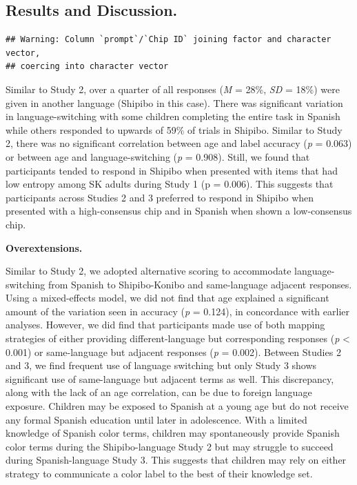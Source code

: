 \documentclass[man]{apa6}
\theoremstyle{definition}
\theoremstyle{definition}
\theoremstyle{definition}
\theoremstyle{remark}
\begin{document}
\subsection{Results and Discussion.}\label{results-and-discussion.}

\begin{verbatim}
## Warning: Column `prompt`/`Chip ID` joining factor and character vector,
## coercing into character vector
\end{verbatim}

Similar to Study 2, over a quarter of all responses (\emph{M} = 28\%,
\emph{SD} = 18\%) were given in another language (Shipibo in this case).
There was significant variation in language-switching with some children
completing the entire task in Spanish while others responded to upwards
of 59\% of trials in Shipibo. Similar to Study 2, there was no
significant correlation between age and label accuracy (\emph{p} =
0.063) or between age and language-switching (\emph{p} = 0.908). Still,
we found that participants tended to respond in Shipibo when presented
with items that had low entropy among SK adults during Study 1 (p =
0.006). This suggests that participants across Studies 2 and 3 preferred
to respond in Shipibo when presented with a high-consensus chip and in
Spanish when shown a low-consensus chip.

\textbf{Overextensions.}

Similar to Study 2, we adopted alternative scoring to accommodate
language-switching from Spanish to Shipibo-Konibo and same-language
adjacent responses. Using a mixed-effects model, we did not find that
age explained a significant amount of the variation seen in accuracy
(\emph{p} = 0.124), in concordance with earlier analyses. However, we
did find that participants made use of both mapping strategies of either
providing different-language but corresponding responses (\emph{p}
\textless{} 0.001) or same-language but adjacent responses (\emph{p} =
0.002). Between Studies 2 and 3, we find frequent use of language
switching but only Study 3 shows significant use of same-language but
adjacent terms as well. This discrepancy, along with the lack of an age
correlation, can be due to foreign language exposure. Children may be
exposed to Spanish at a young age but do not receive any formal Spanish
education until later in adolescence. With a limited knowledge of
Spanish color terms, children may spontaneously provide Spanish color
terms during the Shipibo-language Study 2 but may struggle to succeed
during Spanish-language Study 3. This suggests that children may rely on
either strategy to communicate a color label to the best of their
knowledge set.
\end{document}
